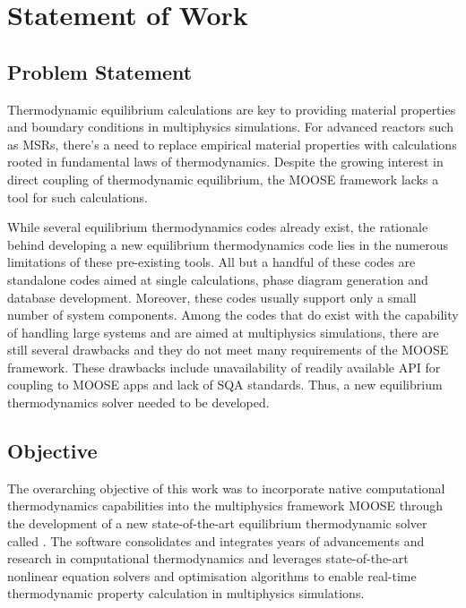 \chapter{Statement of Work} \label{chap:overview}
	
\section{Problem Statement}
    Thermodynamic equilibrium calculations are key to providing material properties and boundary conditions in multiphysics simulations. For advanced reactors such as MSRs, there's a need to replace empirical material properties with calculations rooted in fundamental laws of thermodynamics.  Despite the growing interest in direct coupling of thermodynamic equilibrium, the MOOSE framework lacks a tool for such calculations.

    While several equilibrium thermodynamics codes already exist, the rationale behind developing a new equilibrium thermodynamics code lies in the numerous limitations of these pre-existing tools. All but a handful of these codes are standalone codes aimed at single calculations, phase diagram generation and database development. Moreover, these codes usually support only a small number of system components. Among the codes that do exist with the capability of handling large systems and are aimed at multiphysics simulations, there are still several drawbacks and they do not meet many requirements of the MOOSE framework. These drawbacks include unavailability of readily available API for coupling to MOOSE apps and lack of SQA standards. Thus, a new equilibrium thermodynamics solver needed to be developed.

\section{Objective}
    The overarching objective of this work was to incorporate native computational thermodynamics capabilities into the multiphysics framework MOOSE through the development of a new state-of-the-art equilibrium thermodynamic solver called \GEM. The software consolidates and integrates years of advancements and research in computational thermodynamics and leverages state-of-the-art nonlinear equation solvers and optimisation algorithms to enable real-time thermodynamic property calculation in multiphysics simulations. 


